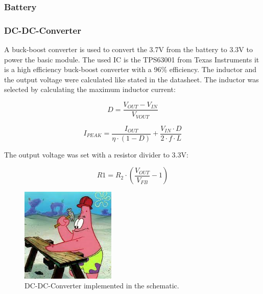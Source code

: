     \subsubsection{Battery}

    \subsubsection{DC-DC-Converter}

        A buck-boost converter is used to convert the 3.7V from the battery to 3.3V to power the
        basic module. The used IC is the TPS63001 from Texas Instruments it is a high efficiency
        buck-boost converter with a 96\% efficiency. The inductor and the output voltage were
        calculated like stated in the datasheet\cite{}. The inductor was selected by calculating
        the maximum inductor current:

        \begin{equation}
            D = \frac{V_{OUT} - V_{IN} }{V_{VOUT}}
        \end{equation}

        \begin{equation}
            I_{PEAK} = \frac{I_{OUT}}{\eta \cdot (1 - D)} + \frac{V_{IN} \cdot D}{2 \cdot f \cdot L} 
        \end{equation}

        The output voltage was set with a resistor divider to 3.3V:

        \begin{equation}
            R1 = R_2 \cdot (\frac{V_{OUT}}{V_{FB}} - 1)
        \end{equation}

        \begin{figure}[H]
            \centering
            \includegraphics[width=0.4\textwidth]{assets/HW/TBD2.png}
            \caption{DC-DC-Converter implemented in the schematic.}
        \end{figure}



